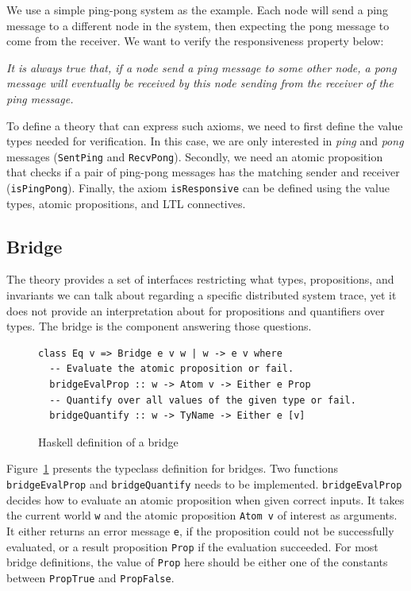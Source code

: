 \documentclass[format=acmsmall, nonacm=true, review=true, screen=true]{acmart}
\newcommand{\mycaption}[1]{\Description{#1}\caption{#1}}
\begin{document}
We use a simple ping-pong system as the example. Each node will send a ping message to a different node in the system, then expecting the pong message to come from the receiver.
We want to verify the responsiveness property below:

\textit{It is always true that, if a node send a ping message to some other node, a pong message will eventually be received by this node sending from the receiver of the ping message.}

To define a theory that can express such axioms, we need to first define the value types needed for verification. In this case, we are only interested in \textit{ping} and \textit{pong} messages (\texttt{SentPing} and \texttt{RecvPong}).
Secondly, we need an atomic proposition that checks if a pair of ping-pong messages has the matching sender and receiver (\texttt{isPingPong}).
Finally, the axiom \texttt{isResponsive} can be defined using the value types, atomic propositions, and LTL connectives.

\subsection{Bridge}
\label{subsec:bridge}

The theory provides a set of interfaces restricting what types, propositions, and invariants we can talk about regarding a specific distributed system trace, yet it does not provide an interpretation about for propositions and quantifiers over types.
The bridge is the component answering those questions.

\begin{figure}[h]
  {
    \fontsize{10}{12}\selectfont
    \begin{verbatim}
class Eq v => Bridge e v w | w -> e v where
  -- Evaluate the atomic proposition or fail.
  bridgeEvalProp :: w -> Atom v -> Either e Prop
  -- Quantify over all values of the given type or fail.
  bridgeQuantify :: w -> TyName -> Either e [v]
\end{verbatim}
  }
  \mycaption{Haskell definition of a bridge}
  \label{fig:bridge-sig}
\end{figure}

Figure~\ref{fig:bridge-sig} presents the typeclass definition for bridges.
Two functions \texttt{bridgeEvalProp} and \texttt{bridgeQuantify} needs to be implemented.
\texttt{bridgeEvalProp} decides how to evaluate an atomic proposition when given correct inputs. It takes the current world \texttt{w} and the atomic proposition \texttt{Atom v} of interest as arguments.
It either returns an error message \texttt{e}, if the proposition could not be successfully evaluated, or a result proposition \texttt{Prop} if the evaluation succeeded.
For most bridge definitions, the value of \texttt{Prop} here should be either one of the constants between \texttt{PropTrue} and \texttt{PropFalse}.
\end{document}
